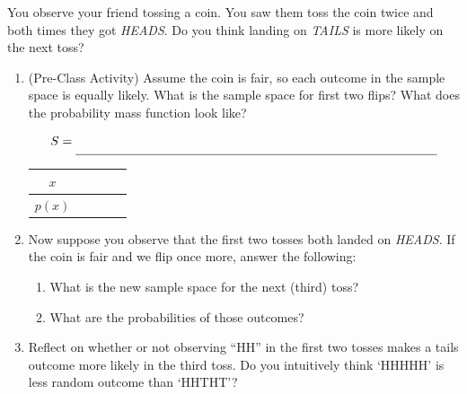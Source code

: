 \documentclass[10pt]{article}
\begin{document}
    \newpage



You observe your friend tossing a coin. You saw them toss the coin twice and both times they got \emph{HEADS}. Do you think landing on \emph{TAILS} is more likely on the next toss?

\begin{enumerate}[label=(\alph*)]

\item  (Pre-Class Activity)
Assume the coin is fair, so each outcome in the sample space is equally likely. What is the sample space for first two flips? What does the probability mass function look like?

{\Large
    \[
    S = \rule[-8pt]{4in}{0.4pt}
    \]
}

\begin{table}[h!]
        \centering
        \begin{tabular}{|c|c|c|c|c|}
            \hline
           $x$  & \hspace{1.5cm} & \hspace{1.5cm} &\hspace{1.5cm}  & \hspace{1.5cm}  \\
           \hline
           $p(x)$  & \hspace{1.5cm} & \hspace{1.5cm} & \hspace{1.5cm}& \hspace{1.5cm} \\
           \hline
        \end{tabular}
\end{table}

\item 
Now suppose you observe that the first two tosses both landed on \emph{HEADS}. If the coin is fair and we flip once more, answer the following:  
\begin{enumerate}[label=\roman*.]
\item What is the new sample space for the next (third) toss?  
\vspace{2cm}
\item What are the probabilities of those outcomes?
\end{enumerate}
\vspace{2cm}

\item Reflect on whether or not observing “HH” in the first two tosses makes a tails outcome more likely in the third toss. Do you intuitively think ‘HHHHH’ is less random outcome than ‘HHTHT’?
\vfill

\end{enumerate}
\end{document}
